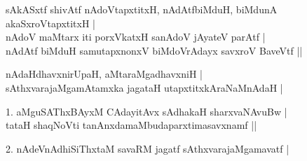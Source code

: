 \begin{entry}
\gl{}
\info{}{}{}{}
\begin{shl}
sAkASxtf shivAtf nAdoVtapxtitxH, nAdAtfbiMduH, biMdunA akaSxroVtapxtitxH |\\
nAdoV maMtarx iti porxVkatxH sanAdoV jAyateV parAtf |\\
nAdAtf biMduH samutapxnonxV biMdoVrAdayx savxroV BaveVtf ||
\end{shl}
\begin{shl}
nAdaHdhavxnirUpaH, aMtaraMgadhavxniH |\\
sAthxvarajaMgamAtamxka jagataH utapxtitxkAraNaMnAdaH |
\end{shl}
\begin{shl}
1. aMguSAThxBAyxM CAdayitAvx sAdhakaH sharxvaNAvuBw |\\
tataH shaqNoVti tanAnxdamaMbudaparxtimasavxnamf ||
\end{shl}
\begin{shl}
2. nAdeVnAdhiSiThxtaM savaRM jagatf sAthxvarajaMgamavatf |
\end{shl}
\end{entry}

